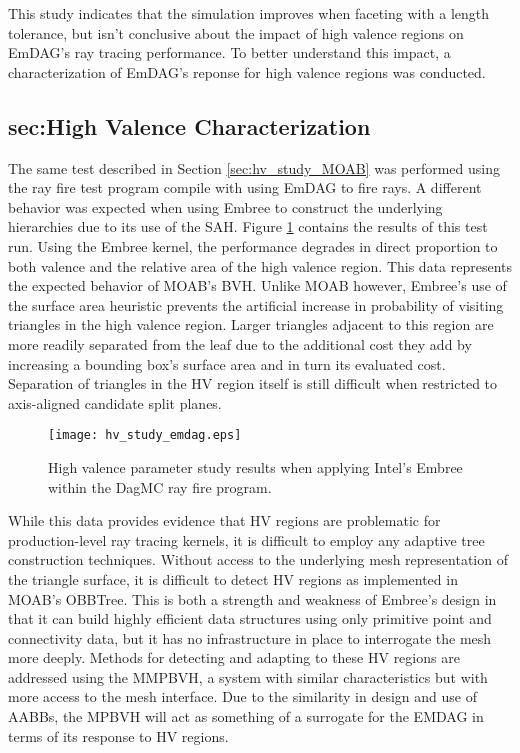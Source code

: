This study indicates that the simulation improves when faceting with a length
tolerance, but isn't conclusive about the impact of high valence regions on
EmDAG's ray tracing performance. To better understand this impact, a
characterization of EmDAG's reponse for high valence regions was conducted.

\subsection{sec:High Valence Characterization}

The same test described in Section \ref{sec:hv_study_MOAB} was performed
using the ray fire test program compile with using EmDAG to fire rays. A
different behavior was expected when using Embree to construct the underlying
hierarchies due to its use of the SAH. Figure \ref{fig:hv_study_emdag} contains
the results of this test run. Using the Embree kernel, the performance degrades
in direct proportion to both valence and the relative area of the high valence
region. This data represents the expected behavior of MOAB's BVH. Unlike MOAB
however, Embree's use of the surface area heuristic prevents the artificial
increase in probability of visiting triangles in the high valence region. Larger
triangles adjacent to this region are more readily separated from the leaf due
to the additional cost they add by increasing a bounding box's surface area and
in turn its evaluated cost. Separation of triangles in the HV region itself is
still difficult when restricted to axis-aligned candidate split planes.

\begin{figure}[H]
  \centering
    \texttt{[image: hv\_study\_emdag.eps]}
    \caption{High valence parameter study results when applying Intel's Embree
      within the DagMC ray fire program.}
    \label{fig:hv_study_emdag}
\end{figure}

While this data provides evidence that HV regions are problematic for
production-level ray tracing kernels, it is difficult to employ any adaptive
tree construction techniques. Without access to the underlying mesh
representation of the triangle surface, it is difficult to detect HV regions as
implemented in MOAB's OBBTree. This is both a strength and weakness of Embree's
design in that it can build highly efficient data structures using only
primitive point and connectivity data, but it has no infrastructure in place to
interrogate the mesh more deeply. Methods for detecting and adapting to these HV
regions are addressed using the MMPBVH, a system with similar characteristics
but with more access to the mesh interface. Due to the similarity in design and
use of AABBs, the MPBVH will act as something of a surrogate for the EMDAG in
terms of its response to HV regions.

